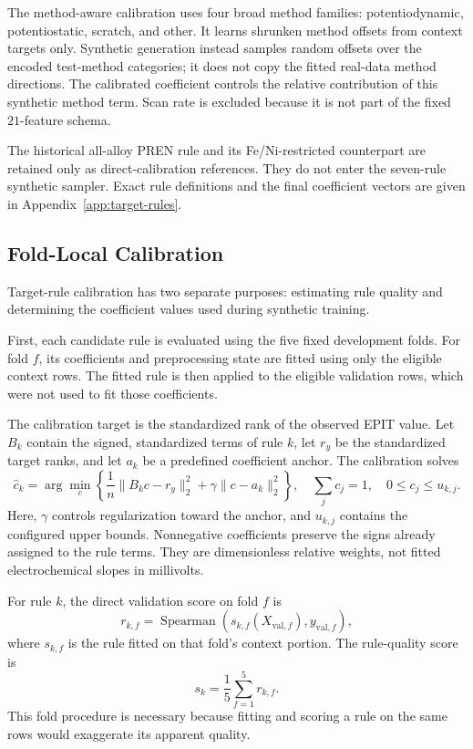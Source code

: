 \documentclass{article}
\begin{document}
The method-aware calibration uses four broad method families:
potentiodynamic, potentiostatic, scratch, and other. It learns shrunken method
offsets from context targets only. Synthetic generation instead samples
random offsets over the encoded test-method categories; it does not copy the
fitted real-data method directions. The calibrated coefficient controls the
relative contribution of this synthetic method term. Scan rate is excluded
because it is not part of the fixed \(21\)-feature schema.

The historical all-alloy PREN rule and its Fe/Ni-restricted counterpart are
retained only as direct-calibration references. They do not enter the seven-rule
synthetic sampler. Exact rule definitions and the final coefficient vectors
are given in Appendix~\ref{app:target-rules}.

\subsection{Fold-Local Calibration}
\label{sec:rule-calibration}

Target-rule calibration has two separate purposes: estimating rule quality
and determining the coefficient values used during synthetic training.

First, each candidate rule is evaluated using the five fixed development
folds. For fold \(f\), its coefficients and preprocessing state are fitted
using only the eligible context rows. The fitted rule is then applied to the
eligible validation rows, which were not used to fit those coefficients.

The calibration target is the standardized rank of the observed EPIT value.
Let \(B_k\) contain the signed, standardized terms of rule \(k\), let
\(r_y\) be the standardized target ranks, and let \(a_k\) be a predefined
coefficient anchor. The calibration solves
\begin{equation}
\widehat c_k=\arg\min_{c}
\left\{
\frac{1}{n}\|B_kc-r_y\|_2^2+\gamma\|c-a_k\|_2^2
\right\},
\quad \sum_jc_j=1,\quad 0\leq c_j\leq u_{k,j}.
\label{eq:rule-calibration}
\end{equation}
Here, \(\gamma\) controls regularization toward the anchor, and
\(u_{k,j}\) contains the configured upper bounds. Nonnegative coefficients
preserve the signs already assigned to the rule terms. They are dimensionless
relative weights, not fitted electrochemical slopes in millivolts.

For rule \(k\), the direct validation score on fold \(f\) is
\[
r_{k,f}=\operatorname{Spearman}
\left(s_{k,f}(X_{\mathrm{val},f}),y_{\mathrm{val},f}\right),
\]
where \(s_{k,f}\) is the rule fitted on that fold's context portion. The
rule-quality score is
\begin{equation}
s_k=\frac{1}{5}\sum_{f=1}^{5}r_{k,f}.
\label{eq:rule-quality}
\end{equation}
This fold procedure is necessary because fitting and scoring a rule on the
same rows would exaggerate its apparent quality.
\end{document}

